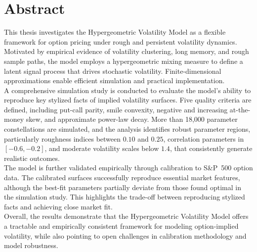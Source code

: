 \section*{Abstract} \label{sec:Abstract}

This thesis investigates the Hypergeometric Volatility Model as a flexible framework for option pricing under rough and persistent volatility dynamics. Motivated by empirical evidence of volatility clustering, long memory, and rough sample paths, the model employs a hypergeometric mixing measure to define a latent signal process that drives stochastic volatility. Finite-dimensional approximations enable efficient simulation and practical implementation.\\
A comprehensive simulation study is conducted to evaluate the model's ability to reproduce key stylized facts of implied volatility surfaces. Five quality criteria are defined, including put-call parity, smile convexity, negative and increasing at-the-money skew, and approximate power-law decay. More than 18{,}000 parameter constellations are simulated, and the analysis identifies robust parameter regions, particularly roughness indices between $0.10$ and $0.25$, correlation parameters in $[-0.6, -0.2]$, and moderate volatility scales below $1.4$, that consistently generate realistic outcomes.\\
The model is further validated empirically through calibration to S\&P~500 option data. The calibrated surfaces successfully reproduce essential market features, although the best-fit parameters partially deviate from those found optimal in the simulation study. This highlights the trade-off between reproducing stylized facts and achieving close market fit.\\
Overall, the results demonstrate that the Hypergeometric Volatility Model offers a tractable and empirically consistent framework for modeling option-implied volatility, while also pointing to open challenges in calibration methodology and model robustness.